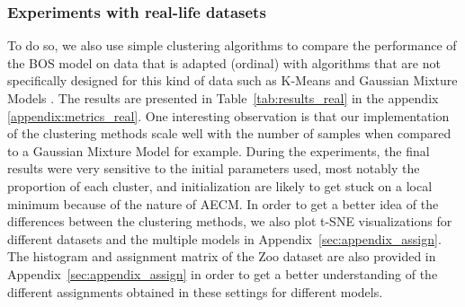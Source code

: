 \subsubsection{Experiments with real-life datasets}
To do so, we also use simple clustering algorithms to compare the performance of the BOS model on data that is adapted (ordinal) with algorithms that are not specifically designed for this kind of data such as K-Means \citep{macqueen1967some} and Gaussian Mixture Models \citep{reynolds2009gaussian}.
The results are presented in Table~\ref{tab:results_real} in the appendix \ref{appendix:metrics_real}. One interesting observation is that our implementation of the clustering methods scale well with the number of samples when compared to a Gaussian Mixture Model for example. 
During the experiments, the final results were very  sensitive to the initial parameters used, most notably the proportion of each cluster, and initialization are likely to get stuck on a local minimum because of the nature of AECM.
In order to get a better idea of the differences between the clustering methods, we also plot t-SNE visualizations \citep{van2008visualizing} for different datasets and the multiple models in Appendix~\ref{sec:appendix_assign}. The histogram and assignment matrix of the Zoo dataset are also provided in Appendix~\ref{sec:appendix_assign} in order to get a better understanding of the different assignments obtained in these settings for different models.






